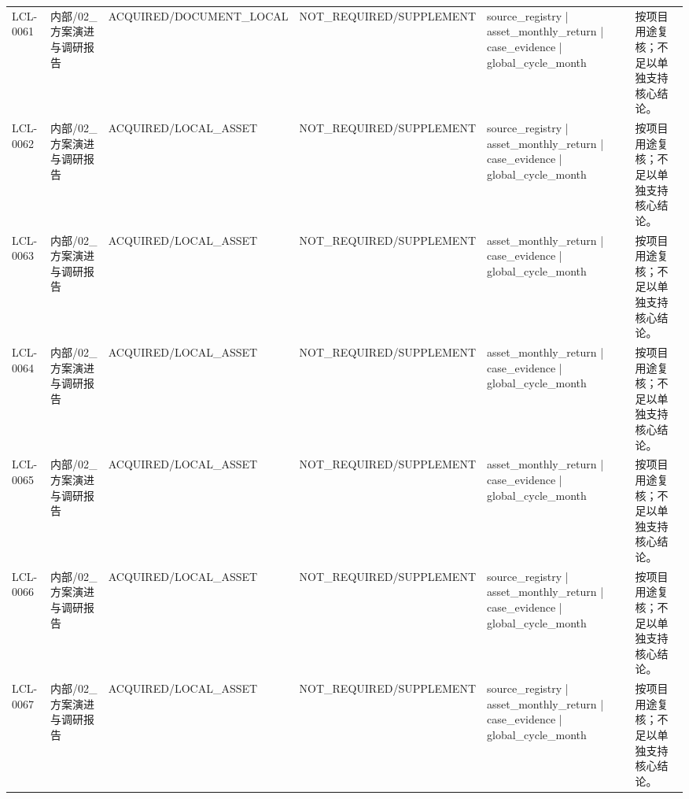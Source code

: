 \begin{landscape}
\begin{longtable}{p{1.8cm}p{2.6cm}p{2.6cm}p{2.6cm}p{4.8cm}p{7.2cm}}
LCL-0061 & 内部/\allowbreak{}02\_\allowbreak{}方案演进与调研报告 & ACQUIRED/\allowbreak{}DOCUMENT\_\allowbreak{}LOCAL & NOT\_\allowbreak{}REQUIRED/\allowbreak{}SUPPLEMENT & source\_\allowbreak{}registry | asset\_\allowbreak{}monthly\_\allowbreak{}return | case\_\allowbreak{}evidence | global\_\allowbreak{}cycle\_\allowbreak{}month & 按项目用途复核；不足以单独支持核心结论。\\
LCL-0062 & 内部/\allowbreak{}02\_\allowbreak{}方案演进与调研报告 & ACQUIRED/\allowbreak{}LOCAL\_\allowbreak{}ASSET & NOT\_\allowbreak{}REQUIRED/\allowbreak{}SUPPLEMENT & source\_\allowbreak{}registry | asset\_\allowbreak{}monthly\_\allowbreak{}return | case\_\allowbreak{}evidence | global\_\allowbreak{}cycle\_\allowbreak{}month & 按项目用途复核；不足以单独支持核心结论。\\
LCL-0063 & 内部/\allowbreak{}02\_\allowbreak{}方案演进与调研报告 & ACQUIRED/\allowbreak{}LOCAL\_\allowbreak{}ASSET & NOT\_\allowbreak{}REQUIRED/\allowbreak{}SUPPLEMENT & asset\_\allowbreak{}monthly\_\allowbreak{}return | case\_\allowbreak{}evidence | global\_\allowbreak{}cycle\_\allowbreak{}month & 按项目用途复核；不足以单独支持核心结论。\\
LCL-0064 & 内部/\allowbreak{}02\_\allowbreak{}方案演进与调研报告 & ACQUIRED/\allowbreak{}LOCAL\_\allowbreak{}ASSET & NOT\_\allowbreak{}REQUIRED/\allowbreak{}SUPPLEMENT & asset\_\allowbreak{}monthly\_\allowbreak{}return | case\_\allowbreak{}evidence | global\_\allowbreak{}cycle\_\allowbreak{}month & 按项目用途复核；不足以单独支持核心结论。\\
LCL-0065 & 内部/\allowbreak{}02\_\allowbreak{}方案演进与调研报告 & ACQUIRED/\allowbreak{}LOCAL\_\allowbreak{}ASSET & NOT\_\allowbreak{}REQUIRED/\allowbreak{}SUPPLEMENT & asset\_\allowbreak{}monthly\_\allowbreak{}return | case\_\allowbreak{}evidence | global\_\allowbreak{}cycle\_\allowbreak{}month & 按项目用途复核；不足以单独支持核心结论。\\
LCL-0066 & 内部/\allowbreak{}02\_\allowbreak{}方案演进与调研报告 & ACQUIRED/\allowbreak{}LOCAL\_\allowbreak{}ASSET & NOT\_\allowbreak{}REQUIRED/\allowbreak{}SUPPLEMENT & source\_\allowbreak{}registry | asset\_\allowbreak{}monthly\_\allowbreak{}return | case\_\allowbreak{}evidence | global\_\allowbreak{}cycle\_\allowbreak{}month & 按项目用途复核；不足以单独支持核心结论。\\
LCL-0067 & 内部/\allowbreak{}02\_\allowbreak{}方案演进与调研报告 & ACQUIRED/\allowbreak{}LOCAL\_\allowbreak{}ASSET & NOT\_\allowbreak{}REQUIRED/\allowbreak{}SUPPLEMENT & source\_\allowbreak{}registry | asset\_\allowbreak{}monthly\_\allowbreak{}return | case\_\allowbreak{}evidence | global\_\allowbreak{}cycle\_\allowbreak{}month & 按项目用途复核；不足以单独支持核心结论。\\

\end{longtable}
\end{landscape}
